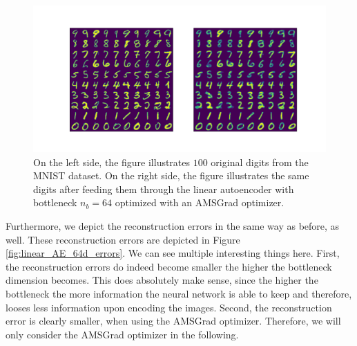 \begin{figure}
\begin{center}
   \begin{minipage}[b]{\linewidth}
      \includegraphics[trim = 15mm 10mm 15mm 15mm, clip, width=\linewidth]{linear_AE_64d_amsgrad_inference}
	\end{minipage}
\end{center}
\caption{On the left side, the figure illustrates $100$ original digits from the MNIST dataset. On the right side, the figure illustrates the same digits after feeding them through the linear autoencoder with bottleneck $n_b=64$ optimized with an AMSGrad optimizer.}\label{fig:linear_AE_64d_amsgrad_inference}
\end{figure}

Furthermore, we depict the reconstruction errors in the same way as before, as well. These reconstruction errors are depicted in Figure \ref{fig:linear_AE_64d_errors}. We can see multiple interesting things here. First, the reconstruction errors do indeed become smaller the higher the bottleneck dimension becomes. This does absolutely make sense, since the higher the bottleneck the more information the neural network is able to keep and therefore, looses less information upon encoding the images. Second, the reconstruction error is clearly smaller, when using the AMSGrad optimizer. Therefore, we will only consider the AMSGrad optimizer in the following.



